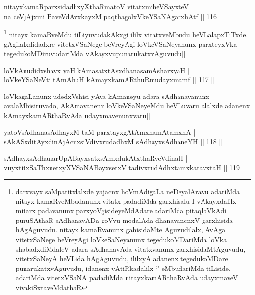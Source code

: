 
\begin{shl}
nitayxkamaRparxsidadhxyXthaRmatoV vitatxmiheVSayxteV |\\
na ceVjAjxmi BaveVdAvxkayxM paqthagolxVkeYSaNAgarxhAtf \hfill || 116 ||
\end{shl}

\begin{artha}
\footnote[1]{darxvayx saMpatitxlalxde yajacnx hoVmAdigaLa neDeyalAravu adariMda nitayx kamaRveMbudanunx vitatx padadiMda garxhisalu I vAkayxdalilx mitarx padavanunx parxyoVgisideyeMdAdare adariMda pitaqloVkAdi puruSAthaR sAdhanavADa goVvu modalAda dhanavanenxV garxhisida hAgAguvudu. nitayx kamaRvanunx gahisidaMte Aguvudilalx, AvAga vitetxSaNege beVreyAgi loVkeSaNeyanunx tegedukoMDariMda loVka shabadxdiMdaleV adara sAdhanavAda vitatxvanunx garxhisidaMtAguvudu, vitetxSaNeyA heVLida hAgAguvudu, ililxyA adanenx tegedukoMDare punarukatxvAguvudu, idanenx vAtiRkadalilx `\stext ' eMbudariMda tiLiside. adariMda vitetxVSaNA padadiMda nitayxkamARthaRvAda udayxmaveV vivakiSxtaveMdathaR} nitayx kamaRveMdu tiLiyuvudakAkxgi ililx vitatxveMbudu heVLalapxTiTxde. gAgilalxdidadxre vitetxVSaNege beVreyAgi loVkeVSaNeyanunx parxteyxVka tegedukoMDiruvudariMda vAkayxvupunarukatxvAguvudu||
\end{artha}

\begin{shl}
loVkAnudidxshayx yaH kAmasatxtAsxdhanasamAsharxyaH |\\
loVkeYSaNeVti tAmAhuH kAmayxkamARthuRmudayxmamf \hfill || 117 ||
\end{shl}

\begin{artha}%
loVkagaLanunx udedxVshisi yAva kAmaneyu adara sAdhanavanunx avalaMbisiruvado, AkAmavanenx loVkeVSaNeyeMdu heVLuvaru alalxde adanenx kAmayxkamARthaRvAda udayxmavenunxvaru||
\end{artha}

\begin{shl}
yatoV\s sAdhanasAdhayxM taM parxtayxgAtAmxnamAtamxnA |\\
sAkASxditAyxdinA\s jAcnxsiVdivxrudadhxM sAdhayxsAdhaneYH \hfill || 118 ||
\end{shl}

\begin{shl}
sAdhayxsAdhanarUpABayxsatxsAmxdukAtxthaRveVdinaH |\\
vuyxtitxSaThxnetxyXVSaNABayxsetxV tadivxrudAdhxtamxkatavxtaH \hfill || 119 ||
\end{shl}

